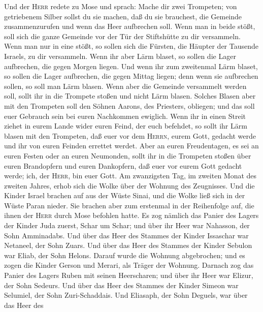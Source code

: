  Und der \textsc{Herr} redete zu Mose und sprach: Mache
dir zwei Trompeten;  von getriebenem Silber sollst du sie
machen, daß du sie brauchest, die Gemeinde zusammenzurufen und wenn das
Heer aufbrechen soll.  Wenn man in beide stößt, soll sich
die ganze Gemeinde vor der Tür der Stiftshütte zu dir versammeln.
 Wenn man nur in eine stößt, so sollen sich die Fürsten,
die Häupter der Tausende Israels, zu dir versammeln.  Wenn
ihr aber Lärm blaset, so sollen die Lager aufbrechen, die gegen Morgen
liegen.  Und wenn ihr zum zweitenmal Lärm blaset, so
sollen die Lager aufbrechen, die gegen Mittag liegen; denn wenn sie
aufbrechen sollen, so soll man Lärm blasen.  Wenn aber die
Gemeinde versammelt werden soll, sollt ihr in die Trompete stoßen und
nicht Lärm blasen.  Solches Blasen aber mit den Trompeten
soll den Söhnen Aarons, des Priesters, obliegen; und das soll euer
Gebrauch sein bei euren Nachkommen ewiglich.  Wenn ihr in
einen Streit ziehet in eurem Lande wider euren Feind, der euch befehdet,
so sollt ihr Lärm blasen mit den Trompeten, daß euer vor dem
\textsc{Herrn}, eurem Gott, gedacht werde und ihr von euren Feinden
errettet werdet.  Aber an euren Freudentagen, es sei an
euren Festen oder an euren Neumonden, sollt ihr in die Trompeten stoßen
über euren Brandopfern und euren Dankopfern, daß euer vor eurem Gott
gedacht werde; ich, der \textsc{Herr}, bin euer Gott.  Am
zwanzigsten Tag, im zweiten Monat des zweiten Jahres, erhob sich die
Wolke über der Wohnung des Zeugnisses.  Und die Kinder
Israel brachen auf aus der Wüste Sinai, und die Wolke ließ sich in der
Wüste Paran nieder.  Sie brachen aber zum erstenmal in
der Reihenfolge auf, die ihnen der \textsc{Herr} durch Mose befohlen
hatte.  Es zog nämlich das Panier des Lagers der Kinder
Juda zuerst, Schar um Schar; und über ihr Heer war Nahasson, der Sohn
Amminadabs.  Und über das Heer des Stammes der Kinder
Issaschar war Netaneel, der Sohn Zuars.  Und über das
Heer des Stammes der Kinder Sebulon war Eliab, der Sohn Helons.
 Darauf wurde die Wohnung abgebrochen; und es zogen die
Kinder Gerson und Merari, als Träger der Wohnung. 
Darnach zog das Panier des Lagers Ruben mit seinen Heerscharen; und über
ihr Heer war Elizur, der Sohn Sedeurs.  Und über das Heer
des Stammes der Kinder Simeon war Selumiel, der Sohn Zuri-Schaddais.
 Und Eliasaph, der Sohn Deguels, war über das Heer des
